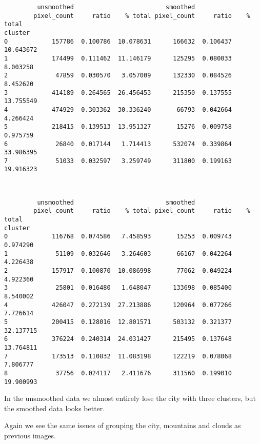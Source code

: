 \documentclass[11pt]{article}
\begin{document}
    
    \begin{verbatim}
         unsmoothed                         smoothed                     
        pixel_count     ratio    % total pixel_count     ratio    % total
cluster                                                                  
0            157786  0.100786  10.078631      166632  0.106437  10.643672
1            174499  0.111462  11.146179      125295  0.080033   8.003258
2             47859  0.030570   3.057009      132330  0.084526   8.452620
3            414189  0.264565  26.456453      215350  0.137555  13.755549
4            474929  0.303362  30.336240       66793  0.042664   4.266424
5            218415  0.139513  13.951327       15276  0.009758   0.975759
6             26840  0.017144   1.714413      532074  0.339864  33.986395
7             51033  0.032597   3.259749      311800  0.199163  19.916323
    \end{verbatim}

    
    \begin{center}
    \end{center}
    { \hspace*{\fill} \\}
    
    
    \begin{verbatim}
         unsmoothed                         smoothed                     
        pixel_count     ratio    % total pixel_count     ratio    % total
cluster                                                                  
0            116768  0.074586   7.458593       15253  0.009743   0.974290
1             51109  0.032646   3.264603       66167  0.042264   4.226438
2            157917  0.100870  10.086998       77062  0.049224   4.922360
3             25801  0.016480   1.648047      133698  0.085400   8.540002
4            426047  0.272139  27.213886      120964  0.077266   7.726614
5            200415  0.128016  12.801571      503132  0.321377  32.137715
6            376224  0.240314  24.031427      215495  0.137648  13.764811
7            173513  0.110832  11.083198      122219  0.078068   7.806777
8             37756  0.024117   2.411676      311560  0.199010  19.900993
    \end{verbatim}

    
    In the unsmoothed data we almost entirely lose the city with three
clusters, but the smoothed data looks better.

Again we see the same issues of grouping the city, mountains and clouds
as previous images.
\end{document}
